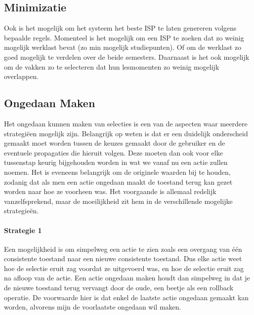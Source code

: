 \subsection{Minimizatie}
Ook is het mogelijk om het systeem het beste ISP te laten genereren volgens bepaalde regels. Momenteel is het mogelijk om een ISP te zoeken dat zo weinig mogelijk werklast bevat (zo min mogelijk studiepunten). Of om de werklast zo goed mogelijk te verdelen over de beide semesters. 
Daarnaast is het ook mogelijk om de vakken zo te selecteren dat hun lesmomenten zo weinig mogelijk overlappen. 

\subsection{Ongedaan Maken}
Het ongedaan kunnen maken van selecties is een van de aspecten waar meerdere strategi\"{e}en mogelijk zijn. Belangrijk op weten is dat er een duidelijk onderscheid gemaakt moet worden tussen de keuzes gemaakt door de gebruiker en de eventuele propagaties die hieruit volgen. Deze moeten dan ook voor elke tussenstap keurig bijgehouden worden in wat we vanaf nu een actie zullen noemen. Het is eveneens belangrijk om de originele waarden bij te houden, zodanig dat als men een actie ongedaan maakt de toestand terug kan gezet worden naar hoe ze voorheen was. Het voorgaande is allemaal redelijk vanzelfsprekend, maar de moeilijkheid zit hem in de verschillende mogelijke strategie\"{e}n. 

\paragraph{Strategie 1}
Een mogelijkheid is om simpelweg een actie te zien zoals een overgang van \'{e}\'{e}n consistente toestand naar een nieuwe consistente toestand. Dus elke actie weet hoe de selectie eruit zag voordat ze uitgevoerd was, en hoe de selectie eruit zag na afloop van de actie. Een actie ongedaan maken houdt dan simpelweg in dat je de nieuwe toestand terug vervangt door de oude, een beetje als een rollback operatie. De voorwaarde hier is dat enkel de laatste actie ongedaan gemaakt kan worden, alvorens mijn de voorlaatste ongedaan wil maken. 


